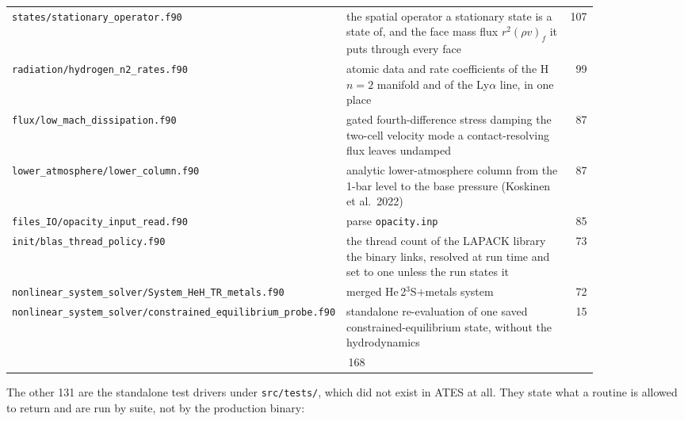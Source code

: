 {\begin{longtable}{@{}>{\raggedright\arraybackslash}p{0.36\linewidth} >{\raggedright\arraybackslash}p{0.50\linewidth} r@{}}
\texttt{states/\allowbreak stationary\_\allowbreak operator.f90} & the spatial operator a stationary state is a state of, and the face mass flux $r^2 (\rho v)_f$ it puts through every face & 107 \\
\texttt{radiation/\allowbreak hydrogen\_\allowbreak n2\_\allowbreak rates.f90} & atomic data and rate coefficients of the H $n{=}2$ manifold and of the Ly$\alpha$ line, in one place & 99 \\
\texttt{flux/\allowbreak low\_\allowbreak mach\_\allowbreak dissipation.f90} & gated fourth-difference stress damping the two-cell velocity mode a contact-resolving flux leaves undamped & 87 \\
\texttt{lower\_\allowbreak atmosphere/\allowbreak lower\_\allowbreak column.f90} & analytic lower-atmosphere column from the 1-bar level to the base pressure (Koskinen et al.\ 2022) & 87 \\
\texttt{files\_\allowbreak IO/\allowbreak opacity\_\allowbreak input\_\allowbreak read.f90} & parse \texttt{opacity.inp} & 85 \\
\texttt{init/\allowbreak blas\_\allowbreak thread\_\allowbreak policy.f90} & the thread count of the LAPACK library the binary links, resolved at run time and set to one unless the run states it & 73 \\
\texttt{nonlinear\_\allowbreak system\_\allowbreak solver/\allowbreak System\_\allowbreak HeH\_\allowbreak TR\_\allowbreak metals.f90} & merged He\,2$^3$S$+$metals system & 72 \\
\texttt{nonlinear\_\allowbreak system\_\allowbreak solver/\allowbreak constrained\_\allowbreak equilibrium\_\allowbreak probe.f90} & standalone re-evaluation of one saved constrained-equilibrium state, without the hydrodynamics & 15 \\
\midrule
\multicolumn{2}{r}{simulation-build new-module total} & 42\,168 \\
\bottomrule
\end{longtable}
}

\noindent
The other 131 are the standalone test drivers under \texttt{src/tests/}, which
did not exist in ATES at all. They state what a routine is allowed to return
and are run by suite, not by the production binary:

